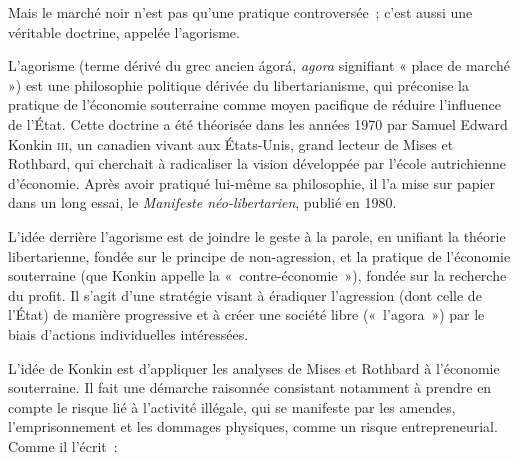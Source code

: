 
Mais le marché noir n'est pas qu'une pratique controversée~; c'est aussi une véritable doctrine, appelée l'agorisme.

L'agorisme (terme dérivé du grec ancien \foreignlanguage{greek}{ágorá}, \emph{agora} signifiant « place de marché ») est une philosophie politique dérivée du libertarianisme, qui préconise la pratique de l'économie souterraine comme moyen pacifique de réduire l'influence de l'État. Cette doctrine a été théorisée dans les années 1970 par Samuel Edward Konkin \textsc{iii}, un canadien vivant aux États-Unis, grand lecteur de Mises et Rothbard, qui cherchait à radicaliser la vision développée par l'école autrichienne d'économie. Après avoir pratiqué lui-même sa philosophie, il l'a mise sur papier dans un long essai, le \emph{Manifeste néo-libertarien}, publié en 1980.

L'idée derrière l'agorisme est de joindre le geste à la parole, en unifiant la théorie libertarienne, fondée sur le principe de non-agression, et la pratique de l'économie souterraine (que Konkin appelle la «~contre-économie~»), fondée sur la recherche du profit. Il s'agit d'une stratégie visant à éradiquer l'agression (dont celle de l'État) de manière progressive et à créer une société libre («~l'agora~») par le biais d'actions individuelles intéressées.

L'idée de Konkin est d'appliquer les analyses de Mises et Rothbard à l'économie souterraine. Il fait une démarche raisonnée consistant notamment à prendre en compte le risque lié à l'activité illégale, qui se manifeste par les amendes, l'emprisonnement et les dommages physiques, comme un risque entrepreneurial. Comme il l'écrit~:

